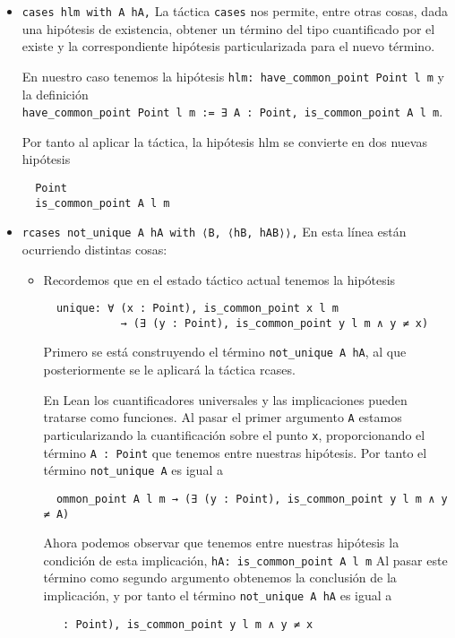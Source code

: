 \begin{itemize}
	\item \lstinline{cases hlm with A hA,} La táctica \lstinline{cases} nos
	      permite, entre otras cosas, dada una hipótesis de existencia, obtener un
	      término del tipo cuantificado por el existe y la correspondiente
	      hipótesis particularizada para el nuevo término.

	      En nuestro caso tenemos la hipótesis \lstinline{hlm: have_common_point Point l m}
	      y la definición \\ \lstinline{have_common_point Point l m := ∃ A : Point, is_common_point A l m}.

	      Por tanto al aplicar la táctica, la hipótesis hlm se convierte en dos nuevas hipótesis
	      \begin{lstlisting}
  Point 
  is_common_point A l m
      \end{lstlisting}

	\item \lstinline{rcases not_unique A hA with ⟨B, ⟨hB, hAB⟩⟩,} En esta línea
	      están ocurriendo distintas cosas:
	      \begin{itemize}

		      \item Recordemos que en el estado táctico actual tenemos la hipótesis
		            \begin{lstlisting}
  unique: ∀ (x : Point), is_common_point x l m 
            → (∃ (y : Point), is_common_point y l m ∧ y ≠ x) 
              \end{lstlisting}

		            Primero se está construyendo el término \lstinline{not_unique A hA},
		            al que posteriormente se le aplicará la táctica {rcases}.

		            En Lean los cuantificadores universales y las implicaciones
		            pueden tratarse como funciones. Al pasar el primer argumento
		            \lstinline{A} estamos particularizando la cuantificación sobre
		            el punto \lstinline{x}, proporcionando el término
		            \lstinline{A : Point} que tenemos entre nuestras hipótesis. Por
		            tanto el término \lstinline{not_unique A} es igual a
		            \begin{lstlisting}
  ommon_point A l m → (∃ (y : Point), is_common_point y l m ∧ y ≠ A)
              \end{lstlisting}
		            Ahora podemos observar que tenemos entre nuestras hipótesis la
		            condición de esta implicación, \lstinline{hA: is_common_point A l m}
		            Al pasar este término como segundo argumento obtenemos la
		            conclusión de la implicación, y por tanto el término
		            \lstinline{not_unique A hA} es igual a
		            \begin{lstlisting}
   : Point), is_common_point y l m ∧ y ≠ x
              \end{lstlisting}


\end{itemize}
\end{itemize}
